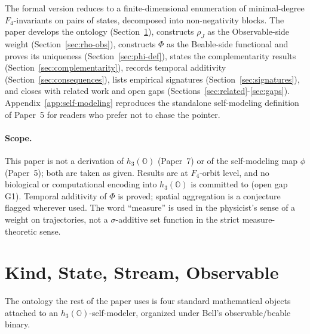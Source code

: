 \documentclass[12pt]{article}
\theoremstyle{remark}
\newcommand{\hthree}{h_3(\mathbb{O})}
\newcommand{\Ffour}{F_4}
\newcommand{\rhoJ}{\rho_J}
\newcommand{\Phiexp}{\Phi}
\begin{document}
\noindent
The formal version reduces to a finite-dimensional enumeration of
minimal-degree $\Ffour$-invariants on pairs of states, decomposed
into non-negativity blocks. The paper develops the ontology
(Section~\ref{sec:ontology}), constructs $\rhoJ$ as the
Observable-side weight (Section~\ref{sec:rho-obs}), constructs
$\Phiexp$ as the Beable-side functional and proves its uniqueness
(Section~\ref{sec:phi-def}), states the complementarity results
(Section~\ref{sec:complementarity}), records temporal additivity
(Section~\ref{sec:consequences}), lists empirical signatures
(Section~\ref{sec:signatures}), and closes with related work and
open gaps (Sections~\ref{sec:related}-\ref{sec:gaps}).
Appendix~\ref{app:self-modeling} reproduces the standalone
self-modeling definition of Paper~5 for readers who prefer not to
chase the pointer.

\paragraph{Scope.}
This paper is not a derivation of $\hthree$ (Paper~7) or of the
self-modeling map $\phi$ (Paper~5); both are taken as given. Results
are at $\Ffour$-orbit level, and no biological or computational
encoding into $\hthree$ is committed to (open gap G1). Temporal
additivity of $\Phiexp$ is proved; spatial aggregation is a
conjecture flagged wherever used. The word ``measure'' is used in the
physicist's sense of a weight on trajectories, not a $\sigma$-additive
set function in the strict measure-theoretic sense.


\section{Kind, State, Stream, Observable}
\label{sec:ontology}

The ontology the rest of the paper uses is four standard mathematical
objects attached to an $\hthree$-self-modeler, organized under Bell's
observable/beable binary.
\end{document}
